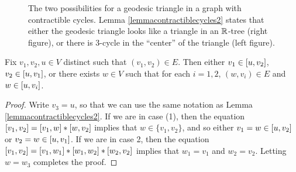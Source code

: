 \begin{figure}
\caption[Triangles in graphs with contractible cycles]{The two possibilities for a geodesic triangle in a graph with contractible cycles. Lemma \ref{lemmacontractiblecycles2} states that either the geodesic triangle looks like a triangle in an $\R$-tree (right figure), or there is 3-cycle in the ``center'' of the triangle (left figure).}
\label{figurecontractiblecycles}
\end{figure}



\begin{corollary}
\label{corollarycontractiblecycles}
Fix $v_1,v_2,u\in V$ distinct such that $(v_1,v_2)\in E$. Then either $v_1\in[u,v_2]$, $v_2\in[u,v_1]$, or there exists $w\in V$ such that for each $i = 1,2$, $(w,v_i)\in E$ and $w\in [u,v_i]$.
\end{corollary}
\begin{proof}
Write $v_3 = u$, so that we can use the same notation as Lemma \ref{lemmacontractiblecycles2}. If we are in case (1), then the equation $[v_1,v_2] = [v_1,w]\ast [w,v_2]$ implies that $w\in\{v_1,v_2\}$, and so either $v_1 = w\in [u,v_2]$ or $v_2 = w\in [u,v_1]$. If we are in case 2, then the equation $[v_1,v_2] = [v_1,w_1]\ast[w_1,w_2]\ast[w_2,v_2]$ implies that $w_1 = v_1$ and $w_2 = v_2$. Letting $w = w_3$ completes the proof.
\end{proof}


